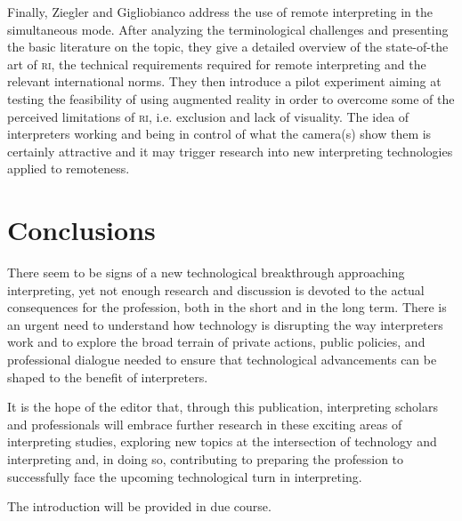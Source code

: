 \documentclass[output=paper]{langsci/langscibook}
\begin{document}
Finally, Ziegler and Gigliobianco address the use of remote interpreting in the simultaneous mode. After analyzing the terminological challenges and presenting the basic literature on the topic, they give a detailed overview of the state-of-the art of \textsc{ri}, the technical requirements required for remote interpreting and the relevant international norms. They then introduce a pilot experiment aiming at testing the feasibility of using augmented reality in order to overcome some of the perceived limitations of \textsc{ri}, i.e. exclusion and lack of visuality. The idea of interpreters working and being in control of what the camera(s) show them is certainly attractive and it may trigger research into new interpreting technologies applied to remoteness. 
 
\section{Conclusions} 
 
There seem to be signs of a new technological breakthrough approaching interpreting, yet not enough research and discussion is devoted to the actual consequences for the profession, both in the short and in the long term. There is an urgent need to understand how technology is disrupting the way interpreters work and to explore the broad terrain of private actions, public policies, and professional dialogue needed to ensure that technological advancements can be shaped to the benefit of interpreters. 

It is the hope of the editor that, through this publication, interpreting scholars and professionals will embrace further research in these exciting areas of interpreting studies, exploring new topics at the intersection of technology and interpreting and, in doing so, contributing to preparing the profession to successfully face the upcoming technological turn in interpreting. 




The introduction will be provided in due course.
\sloppy
\printbibliography[heading=subbibliography,notkeyword=this]
\end{document}

